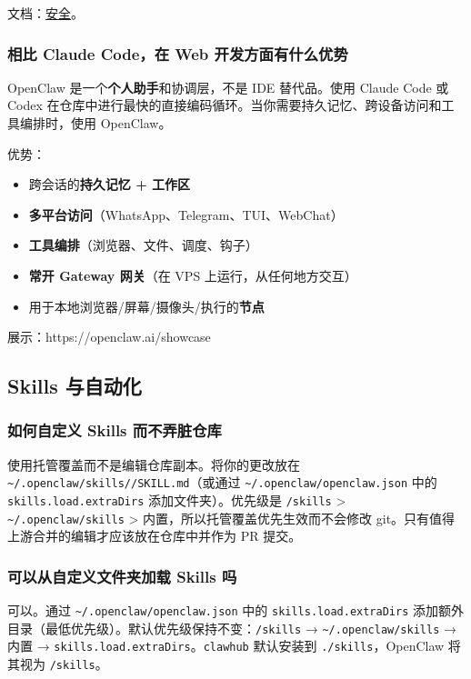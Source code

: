 文档：\href{/gateway/security}{安全}。

\subsubsection{相比 Claude Code，在 Web 开发方面有什么优势}


OpenClaw 是一个\textbf{个人助手}和协调层，不是 IDE 替代品。使用 Claude Code 或 Codex 在仓库中进行最快的直接编码循环。当你需要持久记忆、跨设备访问和工具编排时，使用 OpenClaw。

优势：

\begin{itemize}
  \item 跨会话的\textbf{持久记忆 + 工作区}
  \item \textbf{多平台访问}（WhatsApp、Telegram、TUI、WebChat）
  \item \textbf{工具编排}（浏览器、文件、调度、钩子）
  \item \textbf{常开 Gateway 网关}（在 VPS 上运行，从任何地方交互）
  \item 用于本地浏览器/屏幕/摄像头/执行的\textbf{节点}
\end{itemize}


展示：https://openclaw.ai/showcase

\subsection{Skills 与自动化}


\subsubsection{如何自定义 Skills 而不弄脏仓库}


使用托管覆盖而不是编辑仓库副本。将你的更改放在 \texttt{\textasciitilde{}/.openclaw/skills//SKILL.md}（或通过 \texttt{\textasciitilde{}/.openclaw/openclaw.json} 中的 \texttt{skills.load.extraDirs} 添加文件夹）。优先级是 \texttt{/skills} > \texttt{\textasciitilde{}/.openclaw/skills} > 内置，所以托管覆盖优先生效而不会修改 git。只有值得上游合并的编辑才应该放在仓库中并作为 PR 提交。

\subsubsection{可以从自定义文件夹加载 Skills 吗}


可以。通过 \texttt{\textasciitilde{}/.openclaw/openclaw.json} 中的 \texttt{skills.load.extraDirs} 添加额外目录（最低优先级）。默认优先级保持不变：\texttt{/skills} → \texttt{\textasciitilde{}/.openclaw/skills} → 内置 → \texttt{skills.load.extraDirs}。\texttt{clawhub} 默认安装到 \texttt{./skills}，OpenClaw 将其视为 \texttt{/skills}。

